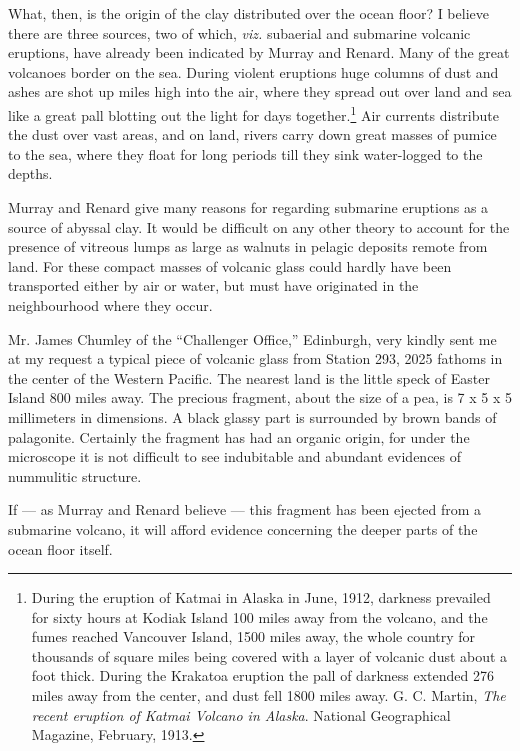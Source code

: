 \documentclass[a4paper, 12pt, oneside, landscape]{article}
\begin{document}
What, then, is the origin of the clay distributed over the ocean floor? I believe there are three sources, two of which, \emph{viz.} subaerial and submarine volcanic eruptions, have already been indicated by Murray and Renard. Many of the great volcanoes border on the sea. During violent eruptions huge columns of dust and ashes are shot up miles high into the air, where they spread out over land and sea like a great pall blotting out the light for days together.\footnote{During the eruption of Katmai in Alaska in June, 1912, darkness prevailed for sixty hours at Kodiak Island 100 miles away from the volcano, and the fumes reached Vancouver Island, 1500 miles away, the whole country for thousands of square miles being covered with a layer of volcanic dust about a foot thick. During the Krakatoa eruption the pall of darkness extended 276 miles away from the center, and dust fell 1800 miles away. G. C. Martin, \emph{The recent eruption of Katmai Volcano in Alaska}. National Geographical Magazine, February, 1913.} Air currents distribute the dust over vast areas, and on land, rivers carry down great masses of pumice to the sea, where they float for long periods till they sink water-logged to the depths.

Murray and Renard give many reasons for regarding submarine eruptions as a source of abyssal clay. It would be difficult on any other theory to account for the presence of vitreous lumps as large as walnuts in pelagic deposits remote from land. For these compact masses of volcanic glass could hardly have been transported either by air or water, but must have originated in the neighbourhood where they occur.

Mr. James Chumley of the ``Challenger Office,'' Edinburgh, very kindly sent me at my request a typical piece of volcanic glass from Station 293, 2025 fathoms in the center of the Western Pacific. The nearest land is the little speck of Easter Island 800 miles away. The precious fragment, about the size of a pea, is 7 x 5 x 5 millimeters in dimensions. A black glassy part is surrounded by brown bands of palagonite. Certainly the fragment has had an organic origin, for under the microscope it is not difficult to see indubitable and abundant evidences of nummulitic structure.

If --- as Murray and Renard believe --- this fragment has been ejected from a submarine volcano, it will afford evidence concerning the deeper parts of the ocean floor itself.
\end{document}
